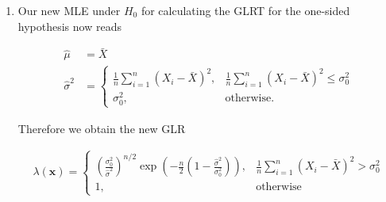 \begin{solution}
\begin{enumerate}[label = (\alph*)]
        \item Our new MLE under $H_0$ for calculating the GLRT for the one-sided
        hypothesis now reads

        \begin{align*}
            \hat{\mu} &= \bar{X} \\
            \hat{\sigma}^2 &= \begin{cases}
                \frac{1}{n}\sum_{i=1}^n (X_i - \bar{X})^2, & \frac{1}{n}\sum_{i=1}^n (X_i - \bar{X})^2 \leq \sigma_0^2 \\
                \sigma_0^2, & \text{otherwise}.
            \end{cases}
        \end{align*}

        Therefore we obtain the new GLR

        \begin{align*}
            \lambda(\textbf{x}) = \begin{cases}
                \left(\frac{\sigma_0^2}{\hat{\sigma}^2}\right)^{n/2}
            \exp\left(-\frac{n}{2}\left(1 - \frac{\hat{\sigma}^2}{\sigma_0^2}\right)\right), & \frac{1}{n}\sum_{i=1}^n (X_i - \bar{X})^2 > \sigma_0^2 \\
            1, & \text{otherwise}
            \end{cases}
        \end{align*}
      \end{enumerate}
    
    \end{solution}
    
    